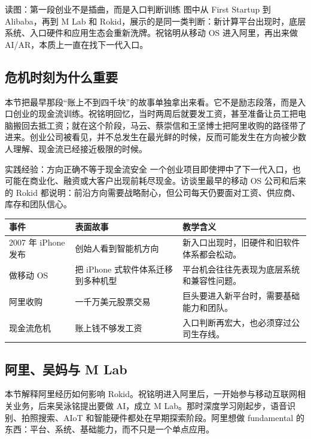 \documentclass[a4paper]{article}
\begin{document}
\begin{knowledgebox}{读图：第一段创业不是插曲，而是入口判断训练}
图中从 First Startup 到 Alibaba，再到 M Lab 和 Rokid，展示的是同一类判断：新计算平台出现时，底层系统、入口硬件和应用生态会重新洗牌。祝铭明从移动 OS 进入阿里，再出来做 AI/AR，本质上一直在找下一代入口。
\end{knowledgebox}

\subsection{危机时刻为什么重要}

本节把最早那段“账上不到四千块”的故事单独拿出来看。它不是励志段落，而是入口创业的现金流训练。祝铭明回忆，当时两周后就要发工资，甚至准备让员工把电脑搬回去抵工资；就在这个阶段，马云、蔡崇信和王坚博士把阿里收购的路径带了进来。创业公司被看见，并不总发生在最光鲜的时候，反而可能发生在方向被少数人理解、现金流已经接近极限的时候。

\begin{warningbox}{实践经验：方向正确不等于现金流安全}
一个创业项目即使押中了下一代入口，也可能在商业化、融资或大客户出现前耗尽现金。访谈里最早的移动 OS 公司和后来的 Rokid 都说明：前沿方向需要战略耐心，但公司每天仍要面对工资、供应商、库存和团队信心。
\end{warningbox}

\noindent\begin{tabularx}{\textwidth}{p{}p{}X}
\toprule
事件 & 表面故事 & 教学含义 \\
\midrule
2007 年 iPhone 发布 & 创始人看到智能机方向 & 新入口出现时，旧硬件和旧软件体系都会松动。 \\
做移动 OS & 把 iPhone 式软件体系迁移到多种机型 & 平台机会往往先表现为底层系统和兼容性问题。 \\
阿里收购 & 一千万美元股票交易 & 巨头要进入新平台时，需要基础能力和团队。 \\
现金流危机 & 账上钱不够发工资 & 入口判断再宏大，也必须穿过公司生存线。 \\
\bottomrule
\end{tabularx}

\subsection{阿里、吴妈与 M Lab}

本节解释阿里经历如何影响 Rokid。祝铭明进入阿里后，一开始参与移动互联网相关业务，后来吴泳铭提出要做 AI，成立 M Lab。那时深度学习刚起步，语音识别、拍照搜索、AIoT 和智能硬件都处在早期探索阶段。阿里想做 fundamental 的东西：平台、系统、基础能力，而不只是一个单点应用。
\end{document}
